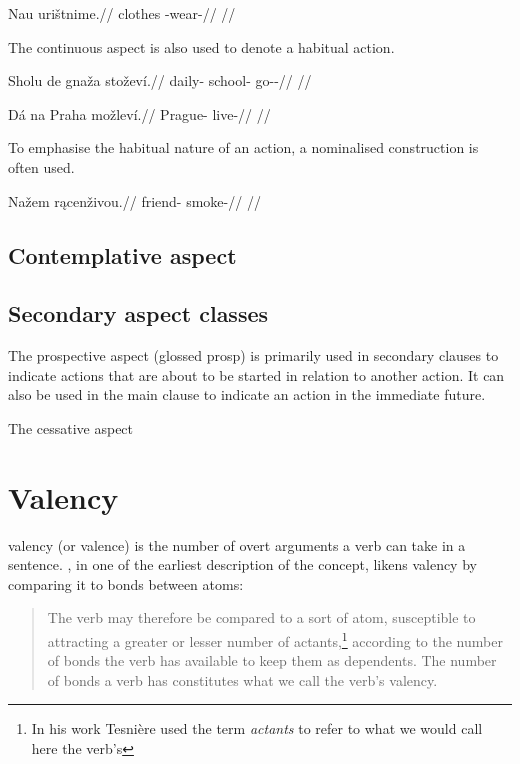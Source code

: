 \pex
\begingl
\gla Nau urištnime.//
\glb clothes \Refl{}-wear-//
\glft {} //
\endgl
\xe

The continuous aspect is also used to denote a habitual action.

\pex
\begingl
\gla Sholu de gnaža stoževí.//
\glb daily-\Ins{}  school-\Acc{} go-\Av{}-\Cont{}//
\glft {} //
\endgl
\xe

\pex
\begingl
\gla Dá na Praha možleví.//
\glb {} \Loc{} Prague-\Acc{} live-//
\glft {} //
\endgl
\xe

To emphasise the habitual nature of an action, a nominalised construction is often used.

\pex
\begingl
\gla Nažem r\k{a}cenživou.//
\glb friend-\First{}\Sg{} smoke-//
\glft {} //
\endgl
\xe


\subsection{Contemplative aspect}

\subsection{Secondary aspect classes}
The prospective aspect (glossed {\cscaps prosp}) is primarily used in secondary clauses to indicate actions that are about to be started in relation to another action. It can also be used in the main clause to indicate an action in the immediate future.


The cessative aspect

\section{Valency}

{\cscaps valency} (or {\cscaps valence}) is the number of overt arguments a verb can take in a sentence. \textcite[239]{tesniere1965}, in one of the earliest description of the concept, likens valency by comparing it to bonds between atoms:
\begin{quotation}
	\small
The verb may therefore be compared to a sort of atom, susceptible to attracting a greater or lesser number of actants,\footnote{In his work Tesni\`ere used the term \emph{actants} to refer to what we would call here the verb's } according to the number of bonds the verb has available to keep them as dependents. The number of bonds a verb has constitutes what we call the verb's valency.
\end{quotation}

